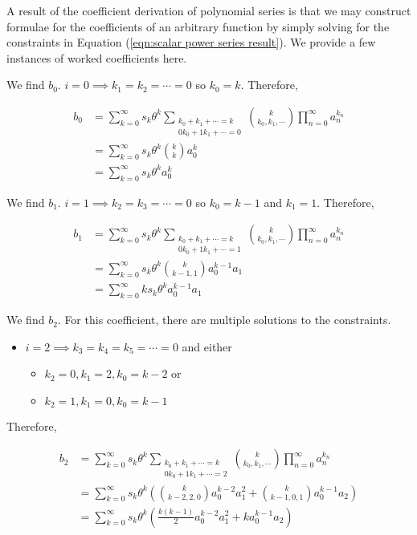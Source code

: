 A result of the coefficient derivation of polynomial series is that we may construct formulae for the coefficients of an arbitrary function by simply solving for the constraints in Equation (\ref{eqn:scalar power series result}). We provide a few instances of worked coefficients here. 

We find $b_0$. $i = 0 \implies k_1 = k_2 = \cdots = 0$ so $k_0 = k$. Therefore,

\begin{align}
    b_0 
    &= \sum_{k=0}^{\infty} s_k \theta^k \sum_{\substack{k_0 + k_1 + \cdots = k \\ 0 k_0 + 1 k_1 + \cdots = 0}} \binom{k}{k_0, k_1, \cdots} \prod_{n=0}^{\infty} a_n^{k_n} \nonumber \\
    &= \sum_{k=0}^{\infty} s_k \theta^k \binom{k}{k} a_0^{k} \nonumber \\
    &= \sum_{k=0}^{\infty} s_k \theta^k a_0^k
\end{align}

We find $b_1$. $i = 1 \implies k_2 = k_3 = \cdots = 0$ so $k_0 = k - 1$ and $k_1 = 1$. Therefore,

\begin{align}
    b_1
    &= \sum_{k=0}^{\infty} s_k \theta^k \sum_{\substack{k_0 + k_1 + \cdots = k \\ 0 k_0 + 1 k_1 + \cdots = 1}} \binom{k}{k_0, k_1, \cdots} \prod_{n=0}^{\infty} a_n^{k_n} \nonumber \\
    &= \sum_{k=0}^{\infty} s_k \theta^k \binom{k}{k - 1, 1} a_0^{k - 1} a_1 \nonumber \\
    &= \sum_{k=0}^{\infty} k s_k \theta^k a_0^{k-1} a_1
\end{align}

We find $b_2$. For this coefficient, there are multiple solutions to the constraints. 

\begin{itemize}
    \item $i = 2 \implies k_3 = k_4 = k_5 = \cdots = 0$ and either
    \begin{itemize}
        \item $k_2 = 0, k_1 = 2, k_0 = k - 2$ or
        \item $k_2 = 1, k_1 = 0, k_0 = k - 1$
    \end{itemize}
\end{itemize}

Therefore,

\begin{align}
    b_2
    &= \sum_{k=0}^{\infty} s_k \theta^k \sum_{\substack{k_0 + k_1 + \cdots = k \\ 0 k_0 + 1 k_1 + \cdots = 2}} \binom{k}{k_0, k_1, \cdots} \prod_{n=0}^{\infty} a_n^{k_n} \nonumber \\
    &= \sum_{k=0}^{\infty} s_k \theta^k \left(\binom{k}{k - 2, 2, 0}a_0^{k-2} a_1^{2} + \binom{k}{k - 1, 0, 1}a_0^{k-1} a_2\right) \nonumber \\
    &= \sum_{k=0}^{\infty} s_k \theta^k \left(\frac{k(k-1)}{2} a_0^{k-2}a_1^{2} + k a_0^{k-1}a_2\right)
\end{align}

